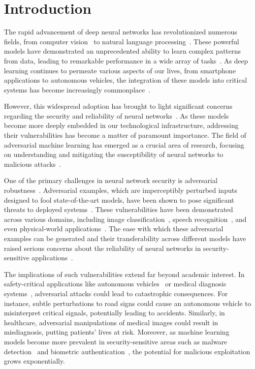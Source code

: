 \section{Introduction}\label{sec:introduction}
The rapid advancement of deep neural networks has revolutionized numerous fields, from computer vision~\citep{krizhevsky2012imagenet} to natural language processing~\citep{devlin2018bert}.
These powerful models have demonstrated an unprecedented ability to learn complex patterns from data, leading to remarkable performance in a wide array of tasks~\citep{lecun2015deep}.
As deep learning continues to permeate various aspects of our lives, from smartphone applications to autonomous vehicles, the integration of these models into critical systems has become increasingly commonplace~\citep{goodfellow2016deep}.

However, this widespread adoption has brought to light significant concerns regarding the security and reliability of neural networks~\citep{biggio2018wild}.
As these models become more deeply embedded in our technological infrastructure, addressing their vulnerabilities has become a matter of paramount importance.
The field of adversarial machine learning has emerged as a crucial area of research, focusing on understanding and mitigating the susceptibility of neural networks to malicious attacks~\citep{vorobeychik2018adversarial}.

One of the primary challenges in neural network security is adversarial robustness~\citep{szegedy2013intriguing}.
Adversarial examples, which are imperceptibly perturbed inputs designed to fool state-of-the-art models, have been shown to pose significant threats to deployed systems~\citep{goodfellow2014explaining}.
These vulnerabilities have been demonstrated across various domains, including image classification~\citep{carlini2017towards}, speech recognition~\citep{carlini2018audio}, and even physical-world applications~\citep{kurakin2016adversarial}.
The ease with which these adversarial examples can be generated and their transferability across different models have raised serious concerns about the reliability of neural networks in security-sensitive applications~\citep{papernot2016transferability}.

The implications of such vulnerabilities extend far beyond academic interest.
In safety-critical applications like autonomous vehicles~\citep{eykholt2018robust} or medical diagnosis systems~\citep{finlayson2019adversarial}, adversarial attacks could lead to catastrophic consequences.
For instance, subtle perturbations to road signs could cause an autonomous vehicle to misinterpret critical signals, potentially leading to accidents.
Similarly, in healthcare, adversarial manipulations of medical images could result in misdiagnosis, putting patients' lives at risk.
Moreover, as machine learning models become more prevalent in security-sensitive areas such as malware detection~\citep{grosse2017adversarial} and biometric authentication~\citep{sharif2016accessorize}, the potential for malicious exploitation grows exponentially.

